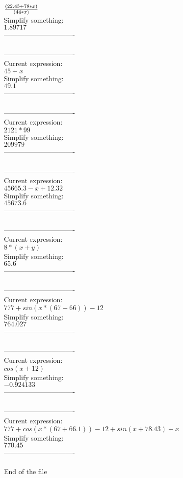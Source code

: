 \documentclass[12pt]{article}
\begin{document}
\( {{(22.45+78*x)}\over{(44*x)}}\) \\
Simplify something:\\
\( 1.89717\) \\
-------------------------------\\
\\
-------------------------------\\
Current expression:\\
\( 45+x\) \\
Simplify something:\\
\( 49.1\) \\
-------------------------------\\
\\
-------------------------------\\
Current expression:\\
\( 2121*99\) \\
Simplify something:\\
\( 209979\) \\
-------------------------------\\
\\
-------------------------------\\
Current expression:\\
\( 45665.3-x+12.32\) \\
Simplify something:\\
\( 45673.6\) \\
-------------------------------\\
\\
-------------------------------\\
Current expression:\\
\( 8*(x+y)\) \\
Simplify something:\\
\( 65.6\) \\
-------------------------------\\
\\
-------------------------------\\
Current expression:\\
\( 777+sin(x*(67+66))-12\) \\
Simplify something:\\
\( 764.027\) \\
-------------------------------\\
\\
-------------------------------\\
Current expression:\\
\( cos(x+12)\) \\
Simplify something:\\
\( -0.924133\) \\
-------------------------------\\
\\
-------------------------------\\
Current expression:\\
\( 777+cos(x*(67+66.1))-12+sin(x+78.43)+x\) \\
Simplify something:\\
\( 770.45\) \\
-------------------------------\\
\\

        End of the file
        
\end{document}
